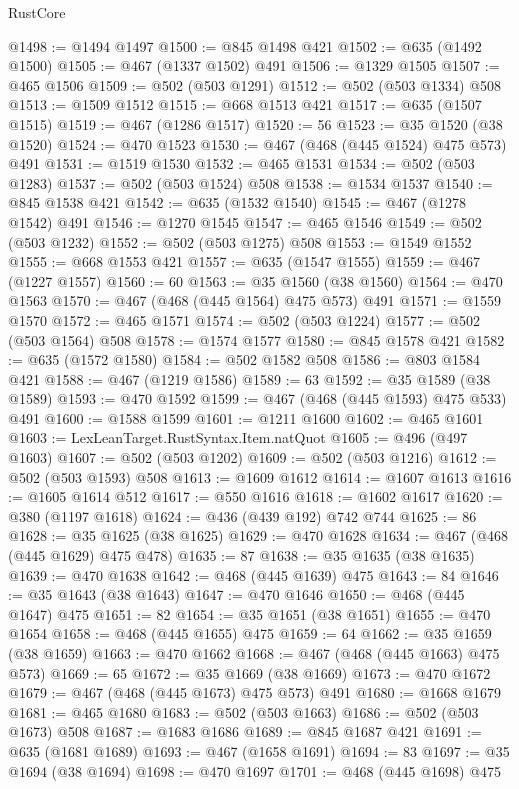 \begin{lexlean}{RustCore}
\begin{coremodule}
@1498 := @1494 @1497
@1500 := @845 @1498 @421
@1502 := @635 (@1492 @1500)
@1505 := @467 (@1337 @1502) @491
@1506 := @1329 @1505
@1507 := @465 @1506
@1509 := @502 (@503 @1291)
@1512 := @502 (@503 @1334) @508
@1513 := @1509 @1512
@1515 := @668 @1513 @421
@1517 := @635 (@1507 @1515)
@1519 := @467 (@1286 @1517)
@1520 := 56
@1523 := @35 @1520 (@38 @1520)
@1524 := @470 @1523
@1530 := @467 (@468 (@445 @1524) @475 @573) @491
@1531 := @1519 @1530
@1532 := @465 @1531
@1534 := @502 (@503 @1283)
@1537 := @502 (@503 @1524) @508
@1538 := @1534 @1537
@1540 := @845 @1538 @421
@1542 := @635 (@1532 @1540)
@1545 := @467 (@1278 @1542) @491
@1546 := @1270 @1545
@1547 := @465 @1546
@1549 := @502 (@503 @1232)
@1552 := @502 (@503 @1275) @508
@1553 := @1549 @1552
@1555 := @668 @1553 @421
@1557 := @635 (@1547 @1555)
@1559 := @467 (@1227 @1557)
@1560 := 60
@1563 := @35 @1560 (@38 @1560)
@1564 := @470 @1563
@1570 := @467 (@468 (@445 @1564) @475 @573) @491
@1571 := @1559 @1570
@1572 := @465 @1571
@1574 := @502 (@503 @1224)
@1577 := @502 (@503 @1564) @508
@1578 := @1574 @1577
@1580 := @845 @1578 @421
@1582 := @635 (@1572 @1580)
@1584 := @502 @1582 @508
@1586 := @803 @1584 @421
@1588 := @467 (@1219 @1586)
@1589 := 63
@1592 := @35 @1589 (@38 @1589)
@1593 := @470 @1592
@1599 := @467 (@468 (@445 @1593) @475 @533) @491
@1600 := @1588 @1599
@1601 := @1211 @1600
@1602 := @465 @1601
@1603 := LexLeanTarget.RustSyntax.Item.natQuot
@1605 := @496 (@497 @1603)
@1607 := @502 (@503 @1202)
@1609 := @502 (@503 @1216)
@1612 := @502 (@503 @1593) @508
@1613 := @1609 @1612
@1614 := @1607 @1613
@1616 := @1605 @1614 @512
@1617 := @550 @1616
@1618 := @1602 @1617
@1620 := @380 (@1197 @1618)
@1624 := @436 (@439 @192) @742 @744
@1625 := 86
@1628 := @35 @1625 (@38 @1625)
@1629 := @470 @1628
@1634 := @467 (@468 (@445 @1629) @475 @478)
@1635 := 87
@1638 := @35 @1635 (@38 @1635)
@1639 := @470 @1638
@1642 := @468 (@445 @1639) @475
@1643 := 84
@1646 := @35 @1643 (@38 @1643)
@1647 := @470 @1646
@1650 := @468 (@445 @1647) @475
@1651 := 82
@1654 := @35 @1651 (@38 @1651)
@1655 := @470 @1654
@1658 := @468 (@445 @1655) @475
@1659 := 64
@1662 := @35 @1659 (@38 @1659)
@1663 := @470 @1662
@1668 := @467 (@468 (@445 @1663) @475 @573)
@1669 := 65
@1672 := @35 @1669 (@38 @1669)
@1673 := @470 @1672
@1679 := @467 (@468 (@445 @1673) @475 @573) @491
@1680 := @1668 @1679
@1681 := @465 @1680
@1683 := @502 (@503 @1663)
@1686 := @502 (@503 @1673) @508
@1687 := @1683 @1686
@1689 := @845 @1687 @421
@1691 := @635 (@1681 @1689)
@1693 := @467 (@1658 @1691)
@1694 := 83
@1697 := @35 @1694 (@38 @1694)
@1698 := @470 @1697
@1701 := @468 (@445 @1698) @475

\end{coremodule}
\end{lexlean}
